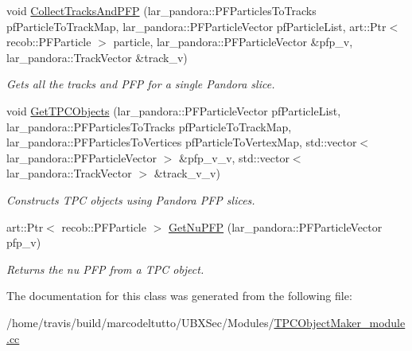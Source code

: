 \begin{DoxyCompactItemize}
\item 
void \hyperlink{group__UBXSec_ga39991fa551ce05bcb4fb10db4f80ab49}{Collect\-Tracks\-And\-P\-F\-P} (lar\-\_\-pandora\-::\-P\-F\-Particles\-To\-Tracks pf\-Particle\-To\-Track\-Map, lar\-\_\-pandora\-::\-P\-F\-Particle\-Vector pf\-Particle\-List, art\-::\-Ptr$<$ recob\-::\-P\-F\-Particle $>$ particle, lar\-\_\-pandora\-::\-P\-F\-Particle\-Vector \&pfp\-\_\-v, lar\-\_\-pandora\-::\-Track\-Vector \&track\-\_\-v)
\begin{DoxyCompactList}\small\item\em Gets all the tracks and P\-F\-P for a single Pandora slice. \end{DoxyCompactList}\item 
void \hyperlink{group__UBXSec_gaf90fb2bf60601767e1db3bd1ca635433}{Get\-T\-P\-C\-Objects} (lar\-\_\-pandora\-::\-P\-F\-Particle\-Vector pf\-Particle\-List, lar\-\_\-pandora\-::\-P\-F\-Particles\-To\-Tracks pf\-Particle\-To\-Track\-Map, lar\-\_\-pandora\-::\-P\-F\-Particles\-To\-Vertices pf\-Particle\-To\-Vertex\-Map, std\-::vector$<$ lar\-\_\-pandora\-::\-P\-F\-Particle\-Vector $>$ \&pfp\-\_\-v\-\_\-v, std\-::vector$<$ lar\-\_\-pandora\-::\-Track\-Vector $>$ \&track\-\_\-v\-\_\-v)
\begin{DoxyCompactList}\small\item\em Constructs T\-P\-C objects using Pandora P\-F\-P slices. \end{DoxyCompactList}\item 
art\-::\-Ptr$<$ recob\-::\-P\-F\-Particle $>$ \hyperlink{group__UBXSec_ga6a47470b5f5690a3626e14bc9f6f360c}{Get\-Nu\-P\-F\-P} (lar\-\_\-pandora\-::\-P\-F\-Particle\-Vector pfp\-\_\-v)
\begin{DoxyCompactList}\small\item\em Returns the nu P\-F\-P from a T\-P\-C object. \end{DoxyCompactList}\end{DoxyCompactItemize}


The documentation for this class was generated from the following file\-:\begin{DoxyCompactItemize}
\item 
/home/travis/build/marcodeltutto/\-U\-B\-X\-Sec/\-Modules/\hyperlink{TPCObjectMaker__module_8cc}{T\-P\-C\-Object\-Maker\-\_\-module.\-cc}\end{DoxyCompactItemize}
